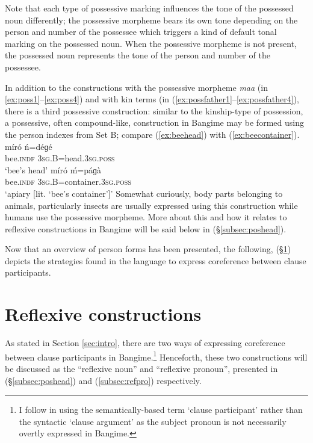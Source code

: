 \documentclass[output=paper]{langscibook}
\begin{document}
Note that each type of possessive marking influences the tone of the possessed noun differently; the possessive morpheme bears its own tone depending on the person and number of the possessee which triggers a kind of default tonal marking on the possessed noun. When the possessive morpheme is not present, the possessed noun represents the tone of the person and number of the possessee.

In addition to the constructions with the possessive morpheme \textit{maa} (in \ref{ex:poss1}--\ref{ex:poss4}) and with kin terms (in (\ref{ex:possfather1}--\ref{ex:possfather4}), there is a third possessive construction: similar to the kinship-type of possession, a possessive, often compound-like, construction in Bangime may be formed using the person indexes from Set B; compare (\ref{ex:beehead}) with (\ref{ex:beecontainer}).
	\ea \label{ex:beehead}
	\gll míró ń=déɡé \\
	bee.\textsc{indf} 3\textsc{sg}.B=head.3\textsc{sg}.\textsc{poss} \\
	\glt `bee's head'
	\z
	\ea \label{ex:beecontainer}
	\gll míró ḿ=páɡà \\
	bee.\textsc{indf} 3\textsc{sg}.B=container.3\textsc{sg}.\textsc{poss} \\
	\glt `apiary [lit. `bee's container']'
	\z
Somewhat curiously, body parts belonging to animals, particularly insects are usually expressed using this construction while humans use the possessive morpheme. More about this and how it relates to reflexive constructions in Bangime will be said below in (\S \ref{subsec:poshead}).

Now that an overview of person forms has been presented, the following, (\S \ref{sec:ref}) depicts the strategies found in the language to express coreference between clause participants.

\section{Reflexive constructions}
\label{sec:ref}
As stated in Section \ref{sec:intro}, there are two ways of expressing coreference between clause participants in Bangime.\footnote{I follow \cite[2--3]{Haspelmath2019} in using the semantically-based term `clause participant' rather than the syntactic `clause argument' as the subject pronoun is not necessarily overtly expressed in Bangime.} Henceforth, these two constructions will be discussed as the ``reflexive noun'' and ``reflexive pronoun'', presented in (\S \ref{subsec:poshead}) and (\ref{subsec:refpro}) respectively.
\end{document}
